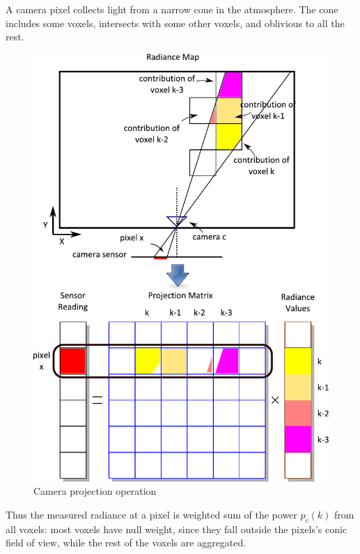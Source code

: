 \documentclass[10pt,twocolumn,letterpaper]{article}
\newcommand{\yoavcomment}[1]{}
\renewcommand{\yoavcomment}[1]{#1} %
\begin{document}
A camera pixel collects light from a narrow cone in the atmosphere.
The cone includes some voxels, intersects with some other voxels, and oblivious to all the rest.
\begin{figure}
  \centering
  \yoavcomment{\includegraphics[width=\columnwidth]{images/sensor.pdf}}
  \caption{Camera projection operation}
  \label{fig:projection}
\end{figure}
Thus the measured radiance at a pixel is weighted sum of the power $p_c(k)$ from all voxels: most voxels have null weight, since they fall outside the pixels's conic field of view, while the rest of the voxels are aggregated.
\end{document}
